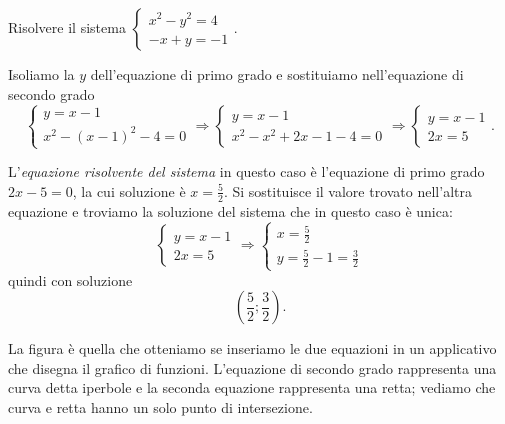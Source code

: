 \begin{esempio}
Risolvere il sistema 
$\left\{\begin{array}{l}x^2-y^2=4\\-x+y=-1\end{array}\right.$.

Isoliamo la $y$ dell'equazione di primo grado e sostituiamo nell'equazione di 
secondo grado 
\[\left\{\begin{array}{l}y=x-1 \\
x^2-(x-1)^2-4=0\end{array}\right.
\Rightarrow \left\{\begin{array}{l}y=x-1 \\
x^2-x^2+2x-1-4=0\end{array}\right.
\Rightarrow \left\{\begin{array}{l}y=x-1\\2x=5\end{array}\right..\]

L'\emph{equazione risolvente del sistema} in questo caso è l'equazione di primo 
grado $2x-5=0$, la cui soluzione è $x=\frac 5 2$. Si sostituisce il valore 
trovato nell'altra equazione e troviamo la soluzione del sistema che in questo 
caso è unica: 
\[\left\{\begin{array}{l}y=x-1 \\2x=5\end{array}\right. 
\Rightarrow\left\{\begin{array}{l}x=\frac 5 2 \\
y=\frac 5 2-1=\frac 3 2\end{array}\right.\] 
quindi con soluzione \[\left(\frac 5 2;\frac 3 2\right).\]

\begin{multicols}{2}
La figura è quella che otteniamo se inseriamo le due equazioni in un 
applicativo 
che disegna il grafico di funzioni. L'equazione di secondo grado rappresenta 
una curva detta iperbole e la seconda equazione rappresenta una retta; 
vediamo che curva e retta hanno un solo punto di intersezione.
\begin{center}

\end{center}
\end{multicols}
\end{esempio}
